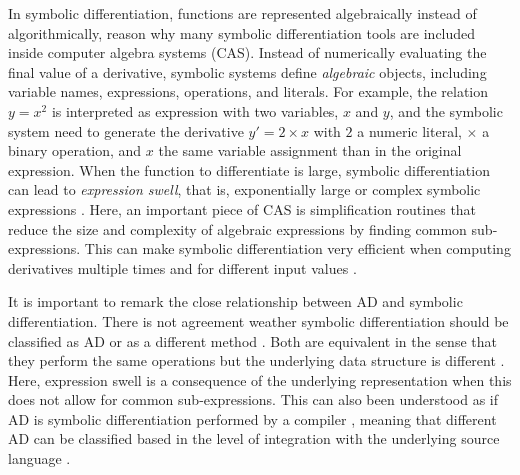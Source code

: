 In symbolic differentiation, functions are represented algebraically instead of algorithmically, reason why many symbolic differentiation tools are included inside computer algebra systems (CAS)\cite{Symbolics_jl_2022}. 
Instead of numerically evaluating the final value of a derivative, symbolic systems define \textit{algebraic} objects, including variable names, expressions, operations, and literals. 
For example, the relation $y = x^2$ is interpreted as expression with two variables, $x$ and $y$, and the symbolic system need to generate the derivative $y' = 2 \times x$ with $2$ a numeric literal, $\times$ a binary operation, and $x$ the same variable assignment than in the original expression.
When the function to differentiate is large, symbolic differentiation can lead to \textit{expression swell}, that is, exponentially large or complex symbolic expressions \cite{Baydin_Pearlmutter_Radul_Siskind_2015}.
Here, an important piece of CAS is simplification routines that reduce the size and complexity of algebraic expressions by finding common sub-expressions.  
This can make symbolic differentiation very efficient when computing derivatives multiple times and for different input values \cite{Dürrbaum_Klier_Hahn_2002}. 

It is important to remark the close relationship between AD and symbolic differentiation.
There is not agreement weather symbolic differentiation should be classified as AD\cite{juedes1991taxonomy, Elliott_2018, Laue2020} or as a different method \cite{Baydin_Pearlmutter_Radul_Siskind_2015}.  
Both are equivalent in the sense that they perform the same operations but the underlying data structure is different \cite{Laue2020}. 
Here, expression swell is a consequence of the underlying representation when this does not allow for common sub-expressions. 
This can also been understood as if AD is symbolic differentiation performed by a compiler \cite{Elliott_2018}, meaning that different AD can be classified based in the level of integration with the underlying source language \cite{juedes1991taxonomy}.
